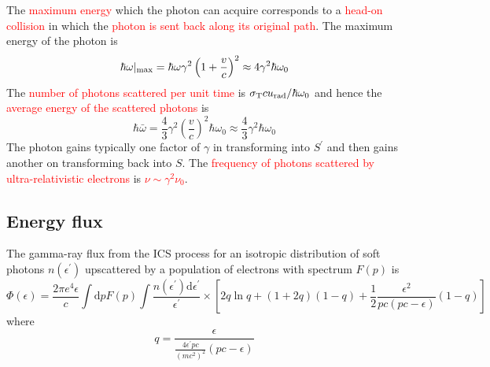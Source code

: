 \documentclass[12pt,a4paper]{article}
\newcommand{\dif}{\mathrm{d}}
\begin{document}
The \textcolor{red}{maximum energy} which the photon can acquire corresponds to a \textcolor{red}{head-on collision} in which the \textcolor{red}{photon is sent back along its original path}. The maximum energy of the photon is
\begin{equation}
\hbar \omega|_{\rm max} = \hbar \omega \gamma^2 \left(1+\frac{v}{c} \right)^2 \approx 4\gamma^2 \hbar \omega_0
\end{equation}
The \textcolor{red}{number of photons scattered per unit time} is \textcolor{red}{$\sigma_{\rm T} cu_{\rm rad}/\hbar \omega_0$} and hence the \textcolor{red}{average energy of the scattered photons} is
\begin{equation}
\hbar \bar{\omega} = \frac{4}{3} \gamma^2 \left(\frac{v}{c} \right)^2 \hbar \omega_0 \approx \frac{4}{3} \gamma^2 \hbar \omega_0
\end{equation}
The photon gains typically one factor of $\gamma$ in transforming into $S^{\prime}$ and then gains another on transforming back into $S$. The \textcolor{red}{frequency of photons scattered by ultra-relativistic electrons} is \textcolor{red}{$\nu \sim \gamma^2 \nu_0$}.













\subsection{Energy flux}
The gamma-ray flux from the ICS process for an isotropic distribution of soft photons $n(\epsilon^{\prime})$ upscattered by a population of electrons with spectrum $F(p)$ is \cite{1970RvMP...42..237B, 2009A&A...497...17V}
\begin{equation}
\Phi(\epsilon) = \frac{2\pi e^4 \epsilon}{c} \int \dif p F(p) \int \frac{n(\epsilon^{\prime}) \dif \epsilon^{\prime}}{\epsilon^{\prime}} \times \left[2q\ln q +(1+2q)(1-q) +\frac{1}{2} \frac{\epsilon^2}{pc(pc-\epsilon)} (1-q) \right]
\end{equation}
where
\begin{equation}
q = \frac{\epsilon}{\frac{4\epsilon^{\prime} pc}{(mc^2)^2}(pc -\epsilon)}
\end{equation}
\end{document}
